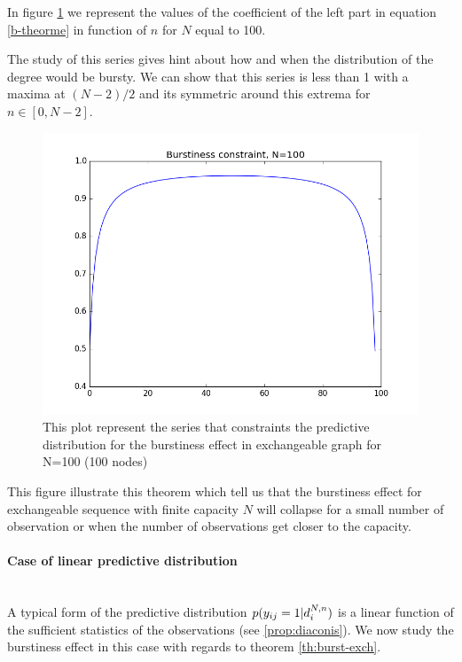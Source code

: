 In figure \ref{fig:bp} we represent the values of the coefficient of the left part in equation \ref{b-theorme} in function of $n$ for $N$ equal to 100.
	
The study of this series gives hint about how and when the distribution of the degree would be bursty. We can show that this series is less than 1 with a maxima at $(N-2)/2$ and its symmetric around this extrema for $n \in [0, N-2]$. 	
	
	\begin{figure}[h]
		\centering
		\includegraphics[scale=0.4]{img/bp}
		\caption{This plot represent the series that constraints the predictive distribution for the burstiness effect in exchangeable graph for N=100 (100 nodes)}
		\label{fig:bp}
	\end{figure}

This figure illustrate this theorem which tell us that the burstiness effect for exchangeable sequence with finite capacity $N$ will collapse for a small number of observation or when the number of observations get closer to the capacity.\\

\paragraph{Case of linear predictive distribution}~\\

A typical form of the predictive distribution $p(y_{ij}=1 | d_i^{N,n})$ is a linear function of the sufficient statistics of the observations (see \ref{prop:diaconis}). We now study the burstiness effect in this case with regards to theorem \ref{th:burst-exch}.

